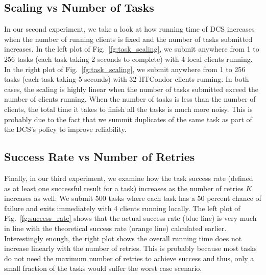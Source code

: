 \documentclass{article}
\begin{document}
\subsection{Scaling vs Number of Tasks}

In our second experiment, we take a look at how running time of DCS increases when the number of running clients is fixed and the number of tasks submitted increases. In the left plot of Fig.~\ref{fg:task_scaling}, we submit anywhere from 1 to 256 tasks (each task taking 2 seconds to complete) with 4 local clients running. In the right plot of Fig.~\ref{fg:task_scaling}, we submit anywhere from 1 to 256 tasks (each task taking 5 seconds) with 32 HTCondor clients running. In both cases, the scaling is highly linear when the number of tasks submitted exceed the number of clients running. When the number of tasks is less than the number of clients, the total time it takes to finish all the tasks is much more noisy. This is probably due to the fact that we summit duplicates of the same task as part of the DCS's policy to improve reliability.

\subsection{Success Rate vs Number of Retries}

Finally, in our third experiment, we examine how the task success rate (defined as at least one successful result for a task) increases as the number of retries $K$ increases as well. We submit 500 tasks where each task has a 50 percent chance of failure and exits immediately with 4 clients running locally. The left plot of Fig.~\ref{fg:success_rate} shows that the actual success rate (blue line) is very much in line with the theoretical success rate (orange line) calculated earlier. Interestingly enough, the right plot shows the overall running time does not increase linearly with the number of retries. This is probably because most tasks do not need the maximum number of retries to achieve success and thus, only a small fraction of the tasks would suffer the worst case scenario.
\end{document}
